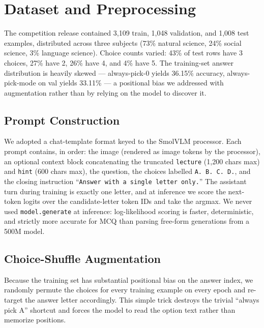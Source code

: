 \documentclass[11pt]{article}
\begin{document}
\section{Dataset and Preprocessing}

The competition release contained 3{,}109 train, 1{,}048 validation, and 1{,}008 test examples, distributed across three subjects (73\% natural science, 24\% social science, 3\% language science). Choice counts varied: 43\% of test rows have 3 choices, 27\% have 2, 26\% have 4, and 4\% have 5. The training-set answer distribution is heavily skewed --- always-pick-0 yields 36.15\% accuracy, always-pick-mode on val yields 33.11\% --- a positional bias we addressed with augmentation rather than by relying on the model to discover it.

\subsection{Prompt Construction}
We adopted a chat-template format keyed to the SmolVLM processor. Each prompt contains, in order: the image (rendered as image tokens by the processor), an optional context block concatenating the truncated \texttt{lecture} (1{,}200 chars max) and \texttt{hint} (600 chars max), the question, the choices labelled \texttt{A. B. C. D.}, and the closing instruction ``\texttt{Answer with a single letter only.}'' The assistant turn during training is exactly one letter, and at inference we score the next-token logits over the candidate-letter token IDs and take the argmax. We never used \texttt{model.generate} at inference: log-likelihood scoring is faster, deterministic, and strictly more accurate for MCQ than parsing free-form generations from a 500M model.

\subsection{Choice-Shuffle Augmentation}
Because the training set has substantial positional bias on the answer index, we randomly permute the choices for every training example on every epoch and re-target the answer letter accordingly. This simple trick destroys the trivial ``always pick A'' shortcut and forces the model to read the option text rather than memorize positions.
\end{document}
